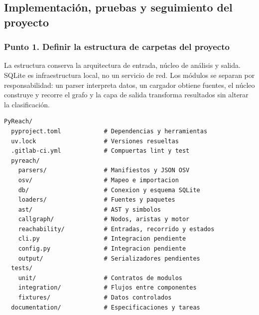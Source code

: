 \clearpage

\subsection{Implementación, pruebas y seguimiento del proyecto}
\subsubsection{Punto 1. Definir la estructura de carpetas del proyecto}
La estructura conserva la arquitectura de entrada, núcleo de análisis y salida. SQLite es infraestructura local, no un servicio de red. Los módulos se separan por responsabilidad: un parser interpreta datos, un cargador obtiene fuentes, el núcleo construye y recorre el grafo y la capa de salida transforma resultados sin alterar la clasificación.

\par\noindent\begin{minipage}{\textwidth}
\begin{lstlisting}[style=p8,caption={Estructura de implementación y extensión prevista}]
PyReach/
  pyproject.toml            # Dependencias y herramientas
  uv.lock                   # Versiones resueltas
  .gitlab-ci.yml            # Compuertas lint y test
  pyreach/
    parsers/                # Manifiestos y JSON OSV
    osv/                    # Mapeo e importacion
    db/                     # Conexion y esquema SQLite
    loaders/                # Fuentes y paquetes
    ast/                    # AST y simbolos
    callgraph/              # Nodos, aristas y motor
    reachability/           # Entradas, recorrido y estados
    cli.py                  # Integracion pendiente
    config.py               # Integracion pendiente
    output/                 # Serializadores pendientes
  tests/
    unit/                   # Contratos de modulos
    integration/            # Flujos entre componentes
    fixtures/               # Datos controlados
  documentation/            # Especificaciones y tareas
\end{lstlisting}
\end{minipage}\par\medskip
{}


